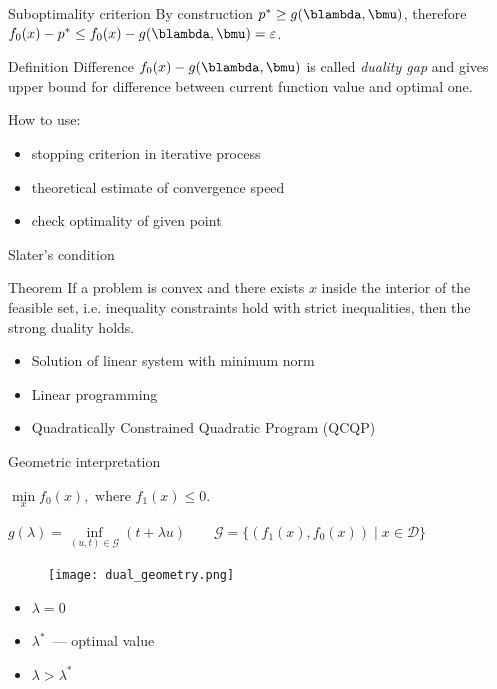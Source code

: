\documentclass[12pt]{beamer}
\begin{document}
\begin{frame}{Suboptimality criterion}
By construction $p^* \geq g(\blambda, \bmu)$, therefore $f_0(x) - p^* \leq f_0(x) - g(\blambda, \bmu) = \varepsilon$.
\begin{block}{Definition}
Difference $f_0(x) - g(\blambda, \bmu)$ is called \emph{duality gap} and gives upper bound for difference between current function value and optimal one.
\end{block}
How to use:
\begin{itemize}
\item stopping criterion in iterative process
\item theoretical estimate of convergence speed
\item check optimality of given point
\end{itemize}
\end{frame}

\begin{frame}{Slater's condition}
\begin{block}{Theorem}
If a problem is convex and there exists $x$ inside the interior of the feasible set, i.e. inequality constraints hold with strict inequalities, then the strong duality holds.
\end{block}

\begin{itemize}
\item Solution of linear system with minimum norm
\item Linear programming
\item Quadratically Constrained Quadratic Program (QCQP)
\end{itemize}
\end{frame}

\begin{frame}{Geometric interpretation}
\begin{center}
$\min\limits_{x} f_0(x), \text{ where } f_1(x) \leq 0.$
\end{center}
$
g(\lambda) = \inf\limits_{(u, t) \in \mathcal{G}} (t + \lambda u) \qquad \mathcal{G} = \{ (f_1(x), f_0(x)) \; | \; x \in \mathcal{D} \}
$

\begin{figure}
\centering
\texttt{[image: dual\_geometry.png]}
\end{figure}
\begin{itemize}
\item $\lambda = 0$
\item $\lambda^*$~--- optimal value
\item $\lambda > \lambda^*$
\end{itemize}
\end{frame}
\end{document}
